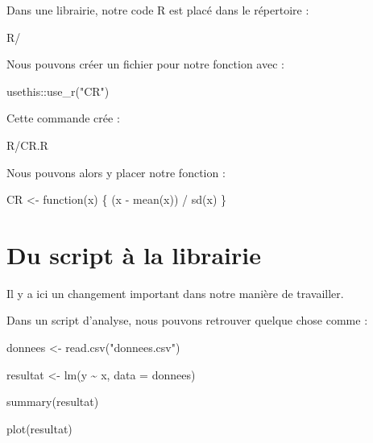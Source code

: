\documentclass[
  letterpaper,
  DIV=11,
  numbers=noendperiod]{scrreprt}
\newenvironment{Shaded}{\begin{snugshade}}{\end{snugshade}}
\newcommand{\AttributeTok}[1]{\textcolor[rgb]{0.40,0.45,0.13}{#1}}
\newcommand{\ControlFlowTok}[1]{\textcolor[rgb]{0.00,0.23,0.31}{#1}}
\newcommand{\FunctionTok}[1]{\textcolor[rgb]{0.28,0.35,0.67}{#1}}
\newcommand{\NormalTok}[1]{\textcolor[rgb]{0.00,0.23,0.31}{#1}}
\newcommand{\OtherTok}[1]{\textcolor[rgb]{0.00,0.23,0.31}{#1}}
\newcommand{\SpecialCharTok}[1]{\textcolor[rgb]{0.37,0.37,0.37}{#1}}
\newcommand{\StringTok}[1]{\textcolor[rgb]{0.13,0.47,0.30}{#1}}
\begin{document}
Dans une librairie, notre code R est placé dans le répertoire :

\begin{Shaded}
\begin{Highlighting}[]
\NormalTok{R/}
\end{Highlighting}
\end{Shaded}

Nous pouvons créer un fichier pour notre fonction avec :

\begin{Shaded}
\begin{Highlighting}[]
\NormalTok{usethis}\SpecialCharTok{::}\FunctionTok{use\_r}\NormalTok{(}\StringTok{"CR"}\NormalTok{)}
\end{Highlighting}
\end{Shaded}

Cette commande crée :

\begin{Shaded}
\begin{Highlighting}[]
\NormalTok{R/CR.R}
\end{Highlighting}
\end{Shaded}

Nous pouvons alors y placer notre fonction :

\begin{Shaded}
\begin{Highlighting}[]
\NormalTok{CR }\OtherTok{\textless{}{-}} \ControlFlowTok{function}\NormalTok{(x) \{}
\NormalTok{  (x }\SpecialCharTok{{-}} \FunctionTok{mean}\NormalTok{(x)) }\SpecialCharTok{/} \FunctionTok{sd}\NormalTok{(x)}
\NormalTok{\}}
\end{Highlighting}
\end{Shaded}

\section*{Du script à la librairie}\label{du-script-uxe0-la-librairie}


Il y a ici un changement important dans notre manière de travailler.

Dans un script d'analyse, nous pouvons retrouver quelque chose comme :

\begin{Shaded}
\begin{Highlighting}[]
\NormalTok{donnees }\OtherTok{\textless{}{-}} \FunctionTok{read.csv}\NormalTok{(}\StringTok{"donnees.csv"}\NormalTok{)}

\NormalTok{resultat }\OtherTok{\textless{}{-}} \FunctionTok{lm}\NormalTok{(y }\SpecialCharTok{\textasciitilde{}}\NormalTok{ x, }\AttributeTok{data =}\NormalTok{ donnees)}

\FunctionTok{summary}\NormalTok{(resultat)}

\FunctionTok{plot}\NormalTok{(resultat)}
\end{Highlighting}
\end{Shaded}
\end{document}
